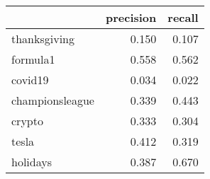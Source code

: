\begin{tabular}{lrr}
\toprule
{} &  precision &  recall \\
\midrule
thanksgiving    &      0.150 &   0.107 \\
formula1        &      0.558 &   0.562 \\
covid19         &      0.034 &   0.022 \\
championsleague &      0.339 &   0.443 \\
crypto          &      0.333 &   0.304 \\
tesla           &      0.412 &   0.319 \\
holidays        &      0.387 &   0.670 \\
\bottomrule
\end{tabular}
